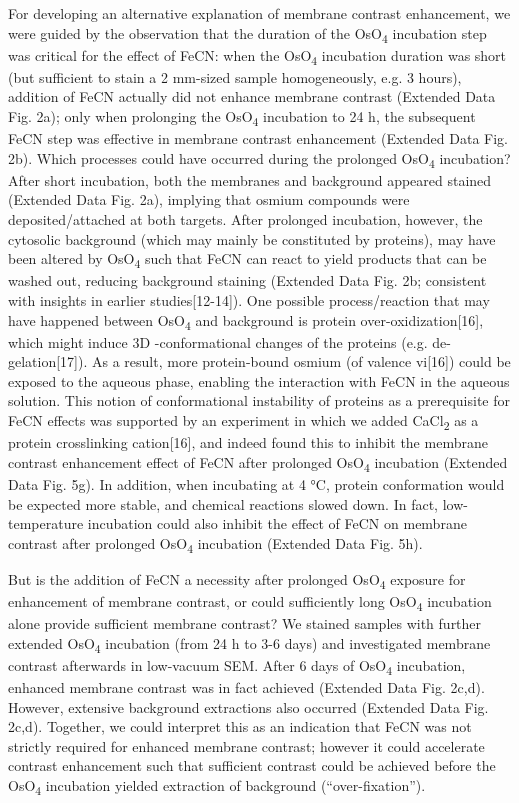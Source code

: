 \documentclass{article}
\begin{document}
For developing an alternative explanation of membrane contrast enhancement, we were guided by the observation that the duration of the OsO\textsubscript{4} incubation step was critical for the effect of FeCN: when the OsO\textsubscript{4} incubation duration was short (but sufficient to stain a 2 mm-sized sample homogeneously, e.g. 3 hours), addition of FeCN actually did not enhance membrane contrast (Extended Data Fig. 2a); only when prolonging the OsO\textsubscript{4} incubation to 24 h, the subsequent FeCN step was effective in membrane contrast enhancement (Extended Data Fig. 2b). Which processes could have occurred during the prolonged OsO\textsubscript{4} incubation? After short incubation, both the membranes and background appeared stained (Extended Data Fig. 2a), implying that osmium compounds were deposited/attached at both targets. After prolonged incubation, however, the cytosolic background (which may mainly be constituted by proteins), may have been altered by OsO\textsubscript{4} such that FeCN can react to yield products that can be washed out, reducing background staining (Extended Data Fig. 2b; consistent with insights in earlier studies[12-14]). One possible process/reaction that may have happened between OsO\textsubscript{4} and background is protein over-oxidization[16], which might induce 3D -conformational changes of the proteins (e.g. de-gelation[17]). As a result, more protein-bound osmium (of valence vi[16]) could be exposed to the aqueous phase, enabling the interaction with FeCN in the aqueous solution. This notion of conformational instability of proteins as a prerequisite for FeCN effects was supported by an experiment in which we added CaCl\textsubscript{2} as a protein crosslinking cation[16], and indeed found this to inhibit the membrane contrast enhancement effect of FeCN after prolonged OsO\textsubscript{4} incubation (Extended Data Fig. 5g). In addition, when incubating at 4 °C, protein conformation would be expected more stable, and chemical reactions slowed down. In fact, low-temperature incubation could also inhibit the effect of FeCN on membrane contrast after prolonged OsO\textsubscript{4} incubation (Extended Data Fig. 5h).  

But is the addition of FeCN a necessity after prolonged OsO\textsubscript{4} exposure for enhancement of membrane contrast, or could sufficiently long OsO\textsubscript{4} incubation alone provide sufficient membrane contrast? We stained samples with further extended OsO\textsubscript{4} incubation (from 24 h to 3-6 days) and investigated membrane contrast afterwards in low-vacuum SEM. After 6 days of OsO\textsubscript{4} incubation, enhanced membrane contrast was in fact achieved (Extended Data Fig. 2c,d). However, extensive background extractions also occurred (Extended Data Fig. 2c,d). Together, we could interpret this as an indication that FeCN was not strictly required for enhanced membrane contrast; however it could accelerate contrast enhancement such that sufficient contrast could be achieved before the OsO\textsubscript{4} incubation yielded extraction of background (“over-fixation”). 
\end{document}
